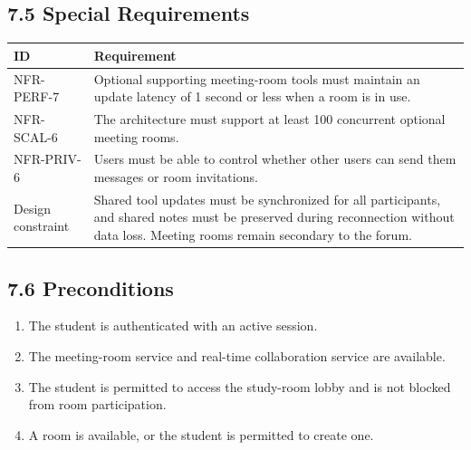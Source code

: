 \documentclass[12pt]{article}
\renewcommand{\baselinestretch}{1.5}
\begin{document}
\subsection*{7.5 Special Requirements}
\par\medskip
\begingroup
\small
\renewcommand{\baselinestretch}{1.0}\selectfont
\renewcommand{\arraystretch}{1.15}
\setlength{\tabcolsep}{6pt}
\begin{longtable}{|>{\raggedright\arraybackslash}p{}|>{\raggedright\arraybackslash}p{}|}
\hline
\textbf{ID} & \textbf{Requirement} \\ \hline
\endhead
NFR-PERF-7 & Optional supporting meeting-room tools must maintain an update latency of 1 second or less when a room is in use. \\ \hline
NFR-SCAL-6 & The architecture must support at least 100 concurrent optional meeting rooms. \\ \hline
NFR-PRIV-6 & Users must be able to control whether other users can send them messages or room invitations. \\ \hline
Design constraint & Shared tool updates must be synchronized for all participants, and shared notes must be preserved during reconnection without data loss. Meeting rooms remain secondary to the forum. \\ \hline
\end{longtable}
\endgroup
\par\medskip
\hypertarget{sec:7-6-preconditions}{}
\subsection*{7.6 Preconditions}
\par\medskip
\begin{enumerate}
\item The student is authenticated with an active session.
\item The meeting-room service and real-time collaboration service are available.
\item The student is permitted to access the study-room lobby and is not blocked from room participation.
\item A room is available, or the student is permitted to create one.
\end{enumerate}
\par\medskip
\hypertarget{sec:7-7-postconditions}{}
\end{document}
